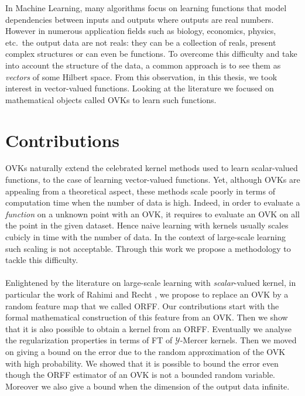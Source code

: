 In Machine Learning, many algorithms focus on learning functions that model
dependencies between inputs and outputs where outputs are real numbers. However
in numerous application fields such as biology, economics, physics, etc.~the
output data are not reals: they can be a collection of reals, present
complex structures or can even be functions. To overcome this difficulty
and take into account the structure of the data, a common approach is to
see them as \emph{vectors} of some Hilbert space. From this observation, in
this thesis, we took interest in vector-valued functions. Looking at the
literature we focused on mathematical objects called \aclp{OVK} to learn
such functions.

\section{Contributions}
\acsp{OVK} naturally extend the celebrated kernel methods used to learn
scalar-valued functions, to the case of learning vector-valued functions.
Yet, although \acsp{OVK} are appealing from a theoretical aspect, these
methods scale poorly in terms of computation time when the number of data
is high. Indeed, in order to evaluate a \emph{function} on a unknown point with
an \acl{OVK}, it requires to evaluate an \acl{OVK} on all the point in the
given dataset.  Hence naive learning with kernels usually scales cubicly in
time with the number of data. In the context of large-scale learning such
scaling is not acceptable. Through this work we propose a methodology to tackle
this difficulty.
\paragraph{}
Enlightened by the literature on large-scale learning with
\emph{scalar}-valued kernel, in particular the work of Rahimi and Recht
\citep{Rahimi2007}, we propose to replace an \acs{OVK} by a random feature
map that we called \acl{ORFF}. Our contributions start with the formal
mathematical construction of this feature from an \acs{OVK}. Then we show
that it is also possible to obtain a kernel from an \acs{ORFF}. Eventually
we analyse the regularization properties in terms of \acl{FT} of
$\mathcal{Y}$-Mercer kernels. Then we moved on giving a bound on the error
due to the random approximation of the \acs{OVK} with high probability.
We showed that it is possible to bound the error even though the \acs{ORFF}
estimator of an \acs{OVK} is not a bounded random variable. Moreover we
also give a bound when the dimension of the output data infinite.
